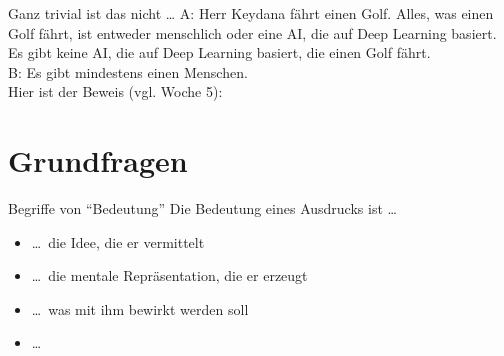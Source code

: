 \begin{frame}
  {Ganz trivial ist das nicht \ldots}
  \onslide<+->
  \onslide<+->
    A: Herr Keydana fährt einen Golf. Alles, was einen Golf fährt, ist entweder menschlich oder eine AI, die auf Deep Learning basiert. Es gibt keine AI, die auf Deep Learning basiert, die einen Golf fährt.\\
    \alert{B: Es gibt mindestens einen Menschen.}\\
    \onslide<+->
    \Halbzeile
    Hier ist der Beweis (vgl. Woche 5):\\
    \onslide<+->
    \Halbzeile
    \centering
\end{frame}

\section{Grundfragen}

\begin{frame}
  {Begriffe von "`Bedeutung"'}
  \onslide<+->
  \onslide<+->
  Die Bedeutung eines Ausdrucks ist \ldots\\
  \Zeile
  \begin{itemize}[<+->]
    \item \ldots\ die Idee, die er vermittelt
    \item \ldots\ die mentale Repräsentation, die er erzeugt
    \item \ldots\ was mit ihm bewirkt werden soll
    \item \ldots\ 
  \end{itemize}
\end{frame}

